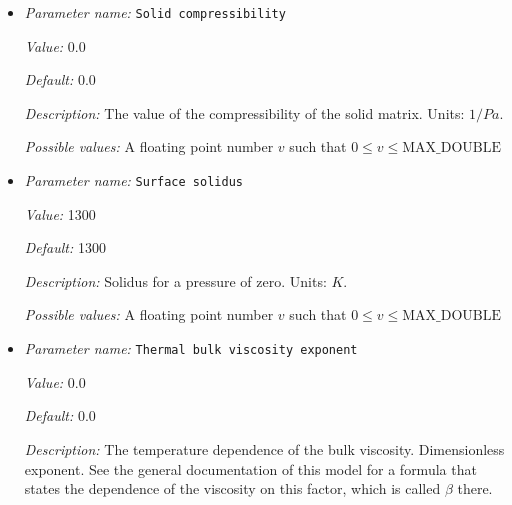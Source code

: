\begin{itemize}
{\it Value:} 293


{\it Default:} 293


{\it Description:} The reference temperature $T_0$. The reference temperature is used in both the density and viscosity formulas. Units: $K$.


{\it Possible values:} A floating point number $v$ such that $0 \leq v \leq \text{MAX\_DOUBLE}$
\item {\it Parameter name:} {\tt Solid compressibility}
\label{parameters:Material model/Melt global/Solid compressibility}
\label{parameters:Material_20model/Melt_20global/Solid_20compressibility}


{\it Value:} 0.0


{\it Default:} 0.0


{\it Description:} The value of the compressibility of the solid matrix. Units: $1/Pa$.


{\it Possible values:} A floating point number $v$ such that $0 \leq v \leq \text{MAX\_DOUBLE}$
\item {\it Parameter name:} {\tt Surface solidus}
\label{parameters:Material model/Melt global/Surface solidus}
\label{parameters:Material_20model/Melt_20global/Surface_20solidus}


{\it Value:} 1300


{\it Default:} 1300


{\it Description:} Solidus for a pressure of zero. Units: $K$.


{\it Possible values:} A floating point number $v$ such that $0 \leq v \leq \text{MAX\_DOUBLE}$
\item {\it Parameter name:} {\tt Thermal bulk viscosity exponent}
\label{parameters:Material model/Melt global/Thermal bulk viscosity exponent}
\label{parameters:Material_20model/Melt_20global/Thermal_20bulk_20viscosity_20exponent}


{\it Value:} 0.0


{\it Default:} 0.0


{\it Description:} The temperature dependence of the bulk viscosity. Dimensionless exponent. See the general documentation of this model for a formula that states the dependence of the viscosity on this factor, which is called $\beta$ there.



\end{itemize}
